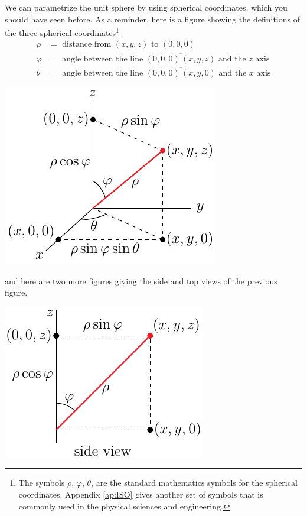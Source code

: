 \begin{eg}[Sphere]
We can parametrize the unit sphere by using spherical coordinates,
which you should have seen before.
As a reminder, here is a figure showing the definitions of the 
three spherical coordinates\footnote{The symbols $\rho$, $\varphi$, $\theta$,
are the standard mathematics symbols for the spherical coordinates. Appendix \ref{ap:ISO} gives another set of symbols that is commonly used in the physical sciences and engineering.}
\begin{align*}
\rho&=\text{ distance from }(x,y,z)\text{ to }(0,0,0)\\
\varphi&=\text{ angle between the line }\overline{(0,0,0)\,(x,y,z)}
\text{ and the $z$ axis}\\
\theta&=\text{ angle between the line }\overline{(0,0,0)\,(x,y,0)}
\text{ and the $x$ axis}
\end{align*}
\begin{efig}
\begin{center}
    \includegraphics{spherical.pdf}
\end{center}
\end{efig}
and here are two more figures giving the side and top views of the 
previous figure.
\begin{efig}
\begin{center}
    \includegraphics{sphericalSide.pdf}\qquad

\end{center}
\end{efig}
\end{eg}
